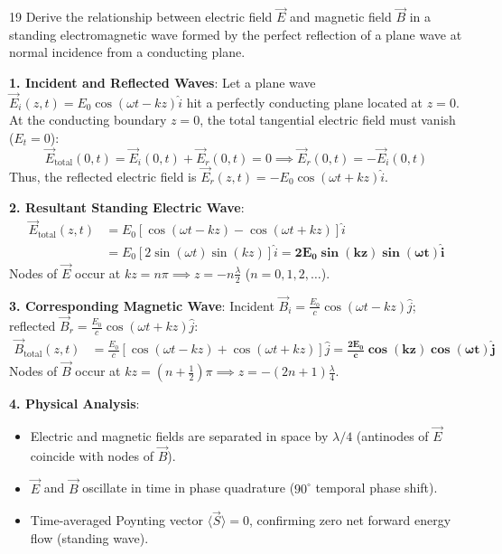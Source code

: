 \begin{theoryq}{19}
Derive the relationship between electric field $\vec{E}$ and magnetic field $\vec{B}$ in a standing electromagnetic wave formed by the perfect reflection of a plane wave at normal incidence from a conducting plane.
\end{theoryq}
\begin{theorysol}
\textbf{1. Incident and Reflected Waves}:
Let a plane wave $\vec{E}_i(z,t) = E_0 \cos(\omega t - kz)\hat{i}$ hit a perfectly conducting plane located at $z=0$.
At the conducting boundary $z=0$, the total tangential electric field must vanish ($E_t = 0$):
\begin{equation}
\vec{E}_{\text{total}}(0,t) = \vec{E}_i(0,t) + \vec{E}_r(0,t) = 0 \implies \vec{E}_r(0,t) = -\vec{E}_i(0,t)
\end{equation}
Thus, the reflected electric field is $\vec{E}_r(z,t) = -E_0 \cos(\omega t + kz)\hat{i}$.

\textbf{2. Resultant Standing Electric Wave}:
\begin{align*}
\vec{E}_{\text{total}}(z,t) &= E_0 [\cos(\omega t - kz) - \cos(\omega t + kz)]\hat{i} \\
&= E_0 [2\sin(\omega t)\sin(kz)]\hat{i} = \mathbf{2 E_0 \sin(kz)\sin(\omega t)\hat{i}}
\end{align*}
Nodes of $\vec{E}$ occur at $kz = n\pi \implies z = -n\frac{\lambda}{2}$ ($n=0, 1, 2,\dots$).

\textbf{3. Corresponding Magnetic Wave}:
Incident $\vec{B}_i = \frac{E_0}{c}\cos(\omega t - kz)\hat{j}$; reflected $\vec{B}_r = \frac{E_0}{c}\cos(\omega t + kz)\hat{j}$:
\begin{align*}
\vec{B}_{\text{total}}(z,t) &= \frac{E_0}{c}[\cos(\omega t - kz) + \cos(\omega t + kz)]\hat{j} = \mathbf{\frac{2 E_0}{c}\cos(kz)\cos(\omega t)\hat{j}}
\end{align*}
Nodes of $\vec{B}$ occur at $kz = (n + \frac{1}{2})\pi \implies z = -(2n+1)\frac{\lambda}{4}$.

\textbf{4. Physical Analysis}:
\begin{itemize}
    \item Electric and magnetic fields are separated in space by $\lambda/4$ (antinodes of $\vec{E}$ coincide with nodes of $\vec{B}$).
    \item $\vec{E}$ and $\vec{B}$ oscillate in time in phase quadrature ($90^\circ$ temporal phase shift).
    \item Time-averaged Poynting vector $\langle \vec{S} \rangle = 0$, confirming zero net forward energy flow (standing wave).
\end{itemize}
\end{theorysol}
\vspace{4mm}

